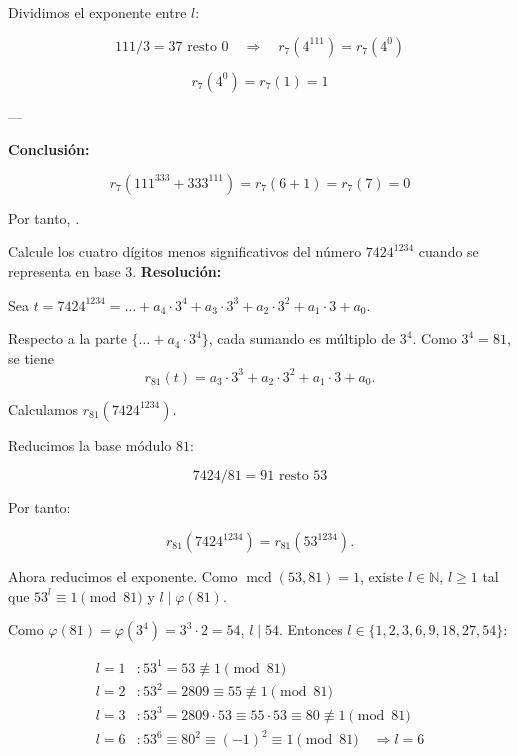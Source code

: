 \documentclass[a4paper,12pt]{article}
\begin{document}
\begin{ejercicio}[title=Ejercicio 29]

Dividimos el exponente entre $l$:

\[
111 / 3 = 37 \text{ resto } 0 \quad \Rightarrow \quad r_7(4^{111}) = r_7(4^0)
\]

\[
r_7(4^0) = r_7(1) = 1
\]

---

\textbf{Conclusión:}

\[
r_7(111^{333} + 333^{111}) = r_7(6 + 1) = r_7(7) = 0
\]

Por tanto, .
\end{ejercicio}

\begin{ejercicio}[title=Ejercicio 30]
Calcule los cuatro dígitos menos significativos del número $7424^{1234}$ cuando se representa en base $3$.
\tcblower
\textbf{Resolución:}

Sea $t = 7424^{1234} = \dots + a_4\cdot 3^4 + a_3\cdot 3^3 + a_2\cdot 3^2 + a_1\cdot 3 + a_0$.

Respecto a la parte $\{\dots + a_4\cdot 3^4\}$, cada sumando es múltiplo de $3^4$.  
Como $3^4 = 81$, se tiene
\[
r_{81}(t) = a_3\cdot 3^3 + a_2\cdot 3^2 + a_1\cdot 3 + a_0.
\]

Calculamos $r_{81}(7424^{1234})$.

Reducimos la base módulo $81$:

\[
7424 / 81 = 91 \text{ resto } 53
\]

Por tanto:

\[
r_{81}(7424^{1234}) = r_{81}(53^{1234}).
\]

Ahora reducimos el exponente. Como $\operatorname{mcd}(53,81)=1$, existe $l\in\mathbb{N}$, $l\ge1$ tal que $53^l\equiv 1\pmod{81}$ y $l\mid\varphi(81)$.

\vspace{0.5em}

Como $\varphi(81)=\varphi(3^4)=3^3\cdot 2 = 54$, $l\mid 54$.  
Entonces $l\in\{1,2,3,6,9,18,27,54\}$:

\[
\begin{aligned}
l=1 &: 53^1 = 53 \not\equiv 1 \pmod{81} \\
l=2 &: 53^2 = 2809 \equiv 55 \not\equiv 1 \pmod{81} \\
l=3 &: 53^3 = 2809\cdot 53 \equiv 55\cdot 53 \equiv 80 \not\equiv 1 \pmod{81} \\
l=6 &: 53^6 \equiv 80^2 \equiv (-1)^2 \equiv 1 \pmod{81} \quad \Rightarrow l=6
\end{aligned}
\]


\end{ejercicio}
\end{document}
